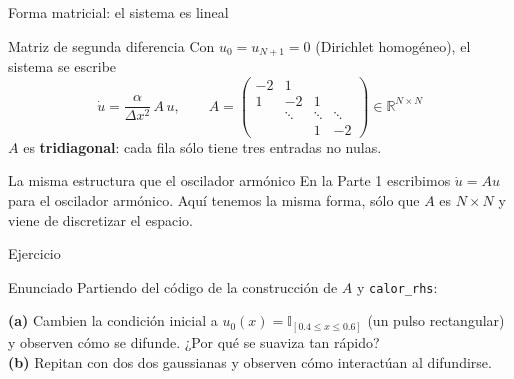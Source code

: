 \documentclass[aspectratio=169,12pt]{beamer}
\begin{document}
\begin{frame}{Forma matricial: el sistema es lineal}
	\begin{resultbox}{Matriz de segunda diferencia}
		Con $u_0=u_{N+1}=0$ (Dirichlet homogéneo), el sistema se escribe
		\[
		\dot u = \frac{\alpha}{\Delta x^2}\, A\, u, \qquad
		A = \begin{pmatrix}
			-2 & 1 &  &  \\
			1 & -2 & 1 &  \\
			& \ddots & \ddots & \ddots \\
			&  & 1 & -2
		\end{pmatrix} \in \mathbb{R}^{N\times N}
		\]
		$A$ es \textbf{tridiagonal}: cada fila sólo tiene tres entradas no nulas.
	\end{resultbox}
	
	\begin{obsbox}{La misma estructura que el oscilador armónico}
		En la Parte 1 escribimos $\dot u = Au$ para el oscilador armónico. Aquí tenemos la misma forma, sólo que $A$ es $N\times N$ y viene de discretizar el espacio.
	\end{obsbox}
\end{frame}

\begin{frame}[fragile]{Ejercicio}
	\begin{taskbox}{Enunciado}
		Partiendo del código de la construcción de $A$ y \texttt{calor\_rhs}:
		
		\vspace{4pt}
		\textbf{(a)} Cambien la condición inicial a $u_0(x) = \mathbb{I}_{[0.4 \le x \le 0.6]}$ (un pulso rectangular) y observen cómo se difunde. ¿Por qué se suaviza tan rápido?\\[6pt]
		\textbf{(b)} Repitan con dos dos gaussianas y observen cómo interactúan al difundirse.\\[4pt]
	\end{taskbox}
\end{frame}
\end{document}
